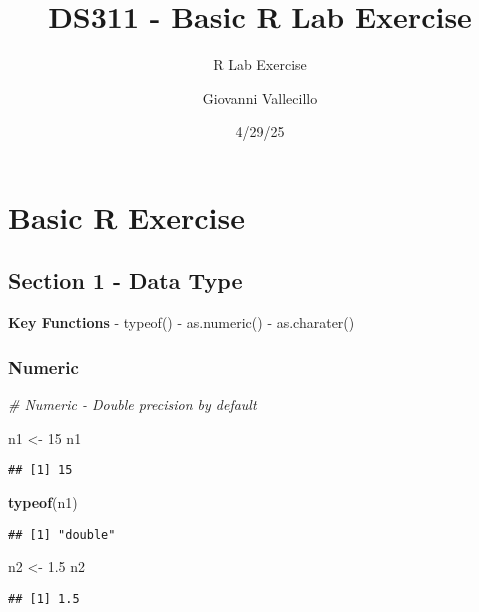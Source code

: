 \documentclass[
]{article}
\title{DS311 - Basic R Lab Exercise}
\subtitle{R Lab Exercise}
\author{Giovanni Vallecillo}
\date{4/29/25}
\newenvironment{Shaded}{\begin{snugshade}}{\end{snugshade}}
\newcommand{\CommentTok}[1]{\textcolor[rgb]{0.56,0.35,0.01}{\textit{#1}}}
\newcommand{\DecValTok}[1]{\textcolor[rgb]{0.00,0.00,0.81}{#1}}
\newcommand{\FloatTok}[1]{\textcolor[rgb]{0.00,0.00,0.81}{#1}}
\newcommand{\FunctionTok}[1]{\textcolor[rgb]{0.13,0.29,0.53}{\textbf{#1}}}
\newcommand{\NormalTok}[1]{#1}
\newcommand{\OtherTok}[1]{\textcolor[rgb]{0.56,0.35,0.01}{#1}}
\begin{document}
\maketitle

\section{Basic R Exercise}\label{basic-r-exercise}

\subsection{Section 1 - Data Type}\label{section-1---data-type}

\textbf{Key Functions} - typeof() - as.numeric() - as.charater()

\subsubsection{Numeric}\label{numeric}

\begin{Shaded}
\begin{Highlighting}[]
\CommentTok{\# Numeric {-} Double precision by default}

\NormalTok{n1 }\OtherTok{\textless{}{-}} \DecValTok{15}  
\NormalTok{n1}
\end{Highlighting}
\end{Shaded}

\begin{verbatim}
## [1] 15
\end{verbatim}

\begin{Shaded}
\begin{Highlighting}[]
\FunctionTok{typeof}\NormalTok{(n1)}
\end{Highlighting}
\end{Shaded}

\begin{verbatim}
## [1] "double"
\end{verbatim}

\begin{Shaded}
\begin{Highlighting}[]
\NormalTok{n2 }\OtherTok{\textless{}{-}} \FloatTok{1.5}
\NormalTok{n2}
\end{Highlighting}
\end{Shaded}

\begin{verbatim}
## [1] 1.5
\end{verbatim}
\end{document}
